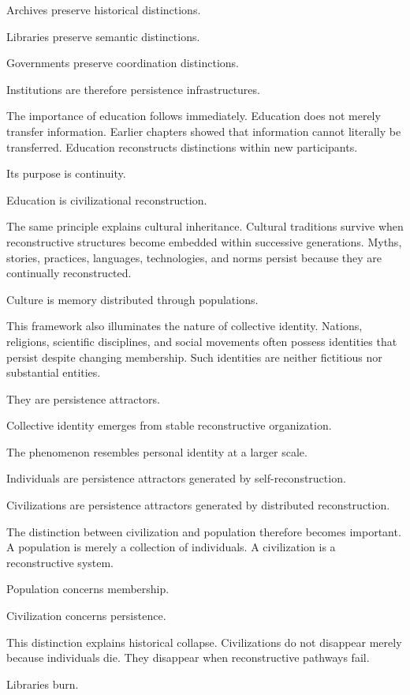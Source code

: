\documentclass[12pt,oneside]{article}
\theoremstyle{definition}
\begin{document}
Archives preserve historical distinctions.

Libraries preserve semantic distinctions.

Governments preserve coordination distinctions.

Institutions are therefore persistence infrastructures.

The importance of education follows immediately. Education does not merely transfer information. Earlier chapters showed that information cannot literally be transferred. Education reconstructs distinctions within new participants.

Its purpose is continuity.

Education is civilizational reconstruction.

The same principle explains cultural inheritance. Cultural traditions survive when reconstructive structures become embedded within successive generations. Myths, stories, practices, languages, technologies, and norms persist because they are continually reconstructed.

Culture is memory distributed through populations.

This framework also illuminates the nature of collective identity. Nations, religions, scientific disciplines, and social movements often possess identities that persist despite changing membership. Such identities are neither fictitious nor substantial entities.

They are persistence attractors.

Collective identity emerges from stable reconstructive organization.

The phenomenon resembles personal identity at a larger scale.

Individuals are persistence attractors generated by self-reconstruction.

Civilizations are persistence attractors generated by distributed reconstruction.

The distinction between civilization and population therefore becomes important. A population is merely a collection of individuals. A civilization is a reconstructive system.

Population concerns membership.

Civilization concerns persistence.

This distinction explains historical collapse. Civilizations do not disappear merely because individuals die. They disappear when reconstructive pathways fail.

Libraries burn.
\end{document}
